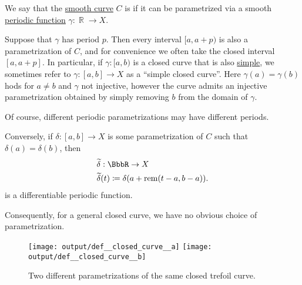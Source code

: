 \begin{definition}\label{def:closed_curve}\mimprovised
  We say that the \hyperref[def:smooth_curve]{smooth curve} \( C \) is  if it can be parametrized via a smooth \hyperref[def:periodic_function]{periodic function} \( \gamma: \BbbR \to X \).

  Suppose that \( \gamma \) has period \( p \). Then every interval \( [a, a + p) \) is also a parametrization of \( C \), and for convenience we often take the closed interval \( [a, a + p] \). In particular, if \( \gamma: [a, b) \) is a closed curve that is also \hyperref[def:simple_curve]{simple}, we sometimes refer to \( \gamma: [a, b] \to X \) as a \enquote{simple closed curve}. Here \( \gamma(a) = \gamma(b) \) hods for \( a \neq b \) and \( \gamma \) not injective, however the curve admits an injective parametrization obtained by simply removing \( b \) from the domain of \( \gamma \).

  Of course, different periodic parametrizations may have different periods.

  Conversely, if \( \delta: [a, b] \to X \) is some parametrization of \( C \) such that \( \delta(a) = \delta(b) \), then
  \begin{equation*}
    \begin{aligned}
      &\widetilde{\delta}: \BbbR \to X \\
      &\widetilde{\delta}(t) \coloneqq \delta(a + \rem(t - a, b - a)).
    \end{aligned}
  \end{equation*}
  is a differentiable periodic function.

  Consequently, for a general closed curve, we have no obvious choice of parametrization.

  \begin{figure}[!ht]
    \hfill
    \texttt{[image: output/def\_\_closed\_curve\_\_a]}
    \hfill
    \hfill
    \texttt{[image: output/def\_\_closed\_curve\_\_b]}
    \hfill
    \hfill
    \caption{Two different parametrizations of the same closed trefoil curve.}\label{fig:def:closed_curve}
  \end{figure}
\end{definition}

